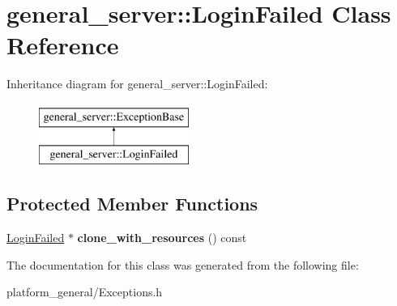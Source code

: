 \hypertarget{classgeneral__server_1_1LoginFailed}{\section{general\-\_\-server\-:\-:\-Login\-Failed \-Class \-Reference}
\label{classgeneral__server_1_1LoginFailed}
}
\-Inheritance diagram for general\-\_\-server\-:\-:\-Login\-Failed\-:\begin{figure}[H]
\begin{center}
\leavevmode
\includegraphics[height=2.000000cm]{classgeneral__server_1_1LoginFailed}
\end{center}
\end{figure}
\subsection*{\-Protected \-Member \-Functions}
\begin{DoxyCompactItemize}
\item 
\hypertarget{classgeneral__server_1_1LoginFailed_a58974fa09ff13fa3f9f2c8652e272d7a}{\hyperlink{classgeneral__server_1_1LoginFailed}{\-Login\-Failed} $\ast$ {\bfseries clone\-\_\-with\-\_\-resources} () const }\label{classgeneral__server_1_1LoginFailed_a58974fa09ff13fa3f9f2c8652e272d7a}

\end{DoxyCompactItemize}


\-The documentation for this class was generated from the following file\-:\begin{DoxyCompactItemize}
\item 
platform\-\_\-general/\-Exceptions.\-h\end{DoxyCompactItemize}
